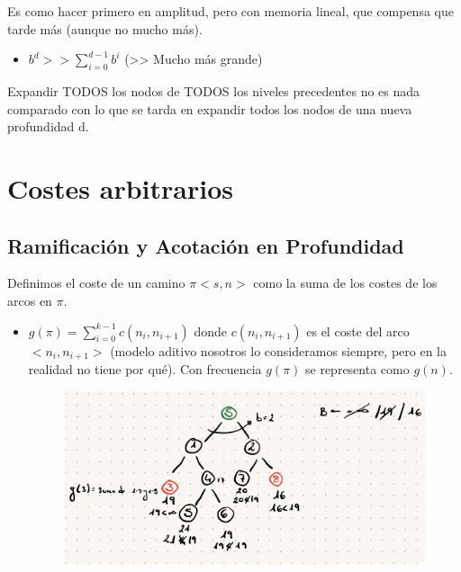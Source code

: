 \documentclass[12pt, twoside, openright]{report} %
\begin{document}
	Es como hacer primero en amplitud, pero con memoria lineal, que
    compensa que tarde más (aunque no mucho más).

    \begin{itemize}
  
    \item
      \(b^d >> \sum _{i=0}^{d-1} b^i\) (\textgreater\textgreater{} Mucho
      más grande)
    \end{itemize}

	Expandir TODOS los nodos de TODOS los niveles precedentes no es nada
    comparado con lo que se tarda en expandir todos los nodos de una
    nueva profundidad d.

	
\section{Costes arbitrarios}
\subsection{Ramificación y Acotación en Profundidad}


    Definimos el coste de un camino \(\pi<s,n>\) como la suma de los
    costes de los arcos en \(\pi\).

    \begin{itemize}
    \item
      \(g(\pi)= \sum_{i=0}^{k-1} c(n_i,n_{i+1})\) donde
      \(c(n_i,n_{i+1})\) es el coste del arco \(<n_i,n_{i+1}>\) (modelo
      aditivo nosotros lo consideramos siempre, pero en la realidad no
      tiene por qué). Con frecuencia \(g(\pi)\) se representa como
      \(g(n)\).
	  \begin{figure}[H]
		{\includegraphics[scale=.3]{Untitled 51.png}}
	\end{figure}
    \end{itemize}
\end{document}
